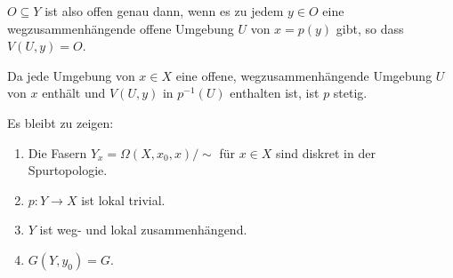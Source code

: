 $O\subseteq Y$ ist also offen genau dann, wenn es zu jedem $y\in O$ eine
wegzusammenhängende offene Umgebung $U$ von $x=p(y)$ gibt, so dass $V(U,y) =
O$.

Da jede Umgebung von $x\in X$ eine offene, wegzusammenhängende Umgebung $U$
von $x$ enthält und $V(U,y)$ in $p^{-1}(U)$ enthalten ist, ist $p$ stetig.

Es bleibt zu zeigen:
\begin{enumerate}[label=(\alph{*})]
  \item\label{prop:3.5.2:a} Die Fasern $Y_x = \Omega(X,x_0,x)/\sim$ für $x\in X$
  sind diskret in der Spurtopologie.
  \item\label{prop:3.5.2:b} $p: Y\to X$ ist lokal trivial.
  \item\label{prop:3.5.2:c} $Y$ ist weg- und lokal zusammenhängend.
  \item\label{prop:3.5.2:d} $G(Y,y_0)=G$.
\end{enumerate}

